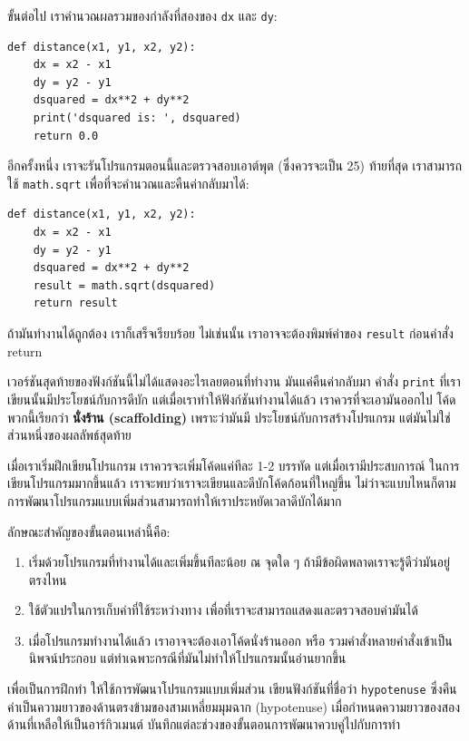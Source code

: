 ขั้นต่อไป เราคำนวณผลรวมของกำลังที่สองของ {\tt dx} และ {\tt dy}:

\begin{verbatim}
def distance(x1, y1, x2, y2):
    dx = x2 - x1
    dy = y2 - y1
    dsquared = dx**2 + dy**2
    print('dsquared is: ', dsquared)
    return 0.0
\end{verbatim}
%
อีกครั้งหนึ่ง เราจะรันโปรแกรมตอนนี้และตรวจสอบเอาต์พุต (ซึ่งควรจะเป็น 25)
ท้ายที่สุด เราสามารถใช้ {\tt math.sqrt} เพื่อที่จะคำนวณและคืนค่ากลับมาได้:

\begin{verbatim}
def distance(x1, y1, x2, y2):
    dx = x2 - x1
    dy = y2 - y1
    dsquared = dx**2 + dy**2
    result = math.sqrt(dsquared)
    return result
\end{verbatim}
%
ถ้ามันทำงานได้ถูกต้อง เราก็เสร็จเรียบร้อย ไม่เช่นนั้น เราอาจจะต้องพิมพ์ค่าของ {\tt result} ก่อนคำสั่ง return

เวอร์ชันสุดท้ายของฟังก์ชันนี้ไม่ได้แสดงอะไรเลยตอนที่ทำงาน มันแค่คืนค่ากลับมา คำสั่ง {\tt print} 
ที่เราเขียนนั้นมีประโยชน์กับการดีบัก แต่เมื่อเราทำให้ฟังก์ชันทำงานได้แล้ว 
เราควรที่จะเอามันออกไป โค้ดพวกนี้เรียกว่า {\bf นั่งร้าน (scaffolding)} เพราะว่ามันมี
ประโยชน์กับการสร้างโปรแกรม แต่มันไม่ใช่ส่วนหนึ่งของผลลัพธ์สุดท้าย

เมื่อเราเริ่มฝึกเขียนโปรแกรม เราควรจะเพิ่มโค้ดแค่ทีละ 1-2 บรรทัด แต่เมื่อเรามีประสบการณ์
ในการเขียนโปรแกรมมากขึ้นแล้ว เราจะพบว่าเราจะเขียนและดีบักโค้ดก้อนที่ใหญ่ขึ้น ไม่ว่าจะแบบไหนก็ตาม
การพัฒนาโปรแกรมแบบเพิ่มส่วนสามารถทำให้เราประหยัดเวลาดีบักได้มาก

ลักษณะสำคัญของขั้นตอนเหล่านี้คือ:


\begin{enumerate}

\item เริ่มด้วยโปรแกรมที่ทำงานได้และเพิ่มขึ้นทีละน้อย ณ จุดใด ๆ 
ถ้ามีข้อผิดพลาดเราจะรู้ดีว่ามันอยู่ตรงไหน

\item ใช้ตัวแปรในการเก็บค่าที่ใช้ระหว่างทาง เพื่อที่เราจะสามารถแสดงและตรวจสอบค่ามันได้

\item เมื่อโปรแกรมทำงานได้แล้ว เราอาจจะต้องเอาโค้ดนั่งร้านออก หรือ รวมคำสั่งหลายคำสั่งเข้าเป็น
นิพจน์ประกอบ แต่ทำเฉพาะกรณีที่มันไม่ทำให้โปรแกรมนั้นอ่านยากขึ้น

\end{enumerate}

เพื่อเป็นการฝึกทำ ให้ใช้การพัฒนาโปรแกรมแบบเพิ่มส่วน เขียนฟังก์ชันที่ชื่อว่า {\tt hypotenuse} 
ซึ่งคืนค่าเป็นความยาวของด้านตรงข้ามของสามเหลี่ยมมุมฉาก (hypotenuse) เมื่อกำหนดความยาวของสองด้านที่เหลือให้เป็นอาร์กิวเมนต์ บันทึกแต่ละช่วงของขั้นตอนการพัฒนาควบคู่ไปกับการทำ




